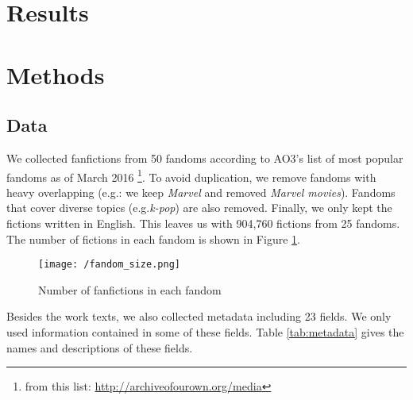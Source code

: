 \documentclass[11pt]{article} %
\begin{document}

\section{Results} %
\label{sec:results}




\section{Methods} %
\label{sec:methods}


\subsection{Data}
We collected fanfictions from 50 fandoms according to AO3's list of most popular fandoms as of March 2016 \footnote{from this list: \url{http://archiveofourown.org/media}}. To avoid duplication, we remove fandoms with heavy overlapping (e.g.: we keep \emph{Marvel} and removed \emph{Marvel movies}). Fandoms that cover diverse topics (e.g.\emph{k-pop}) are also removed. Finally, we only kept the fictions written in English. This leaves us with 904,760 fictions from 25 fandoms. The number of fictions in each fandom is shown in Figure \ref{fig:fandom_size}.

\begin{figure}[htbp]
\begin{center}
\texttt{[image: /fandom\_size.png]}
\caption{Number of fanfictions in each fandom}
\label{fig:fandom_size}
\end{center}
\end{figure}


Besides the work texts, we also collected metadata including 23 fields. We only used information contained in some of these fields. Table \ref{tab:metadata} gives the names and descriptions of these fields. 
\end{document}
